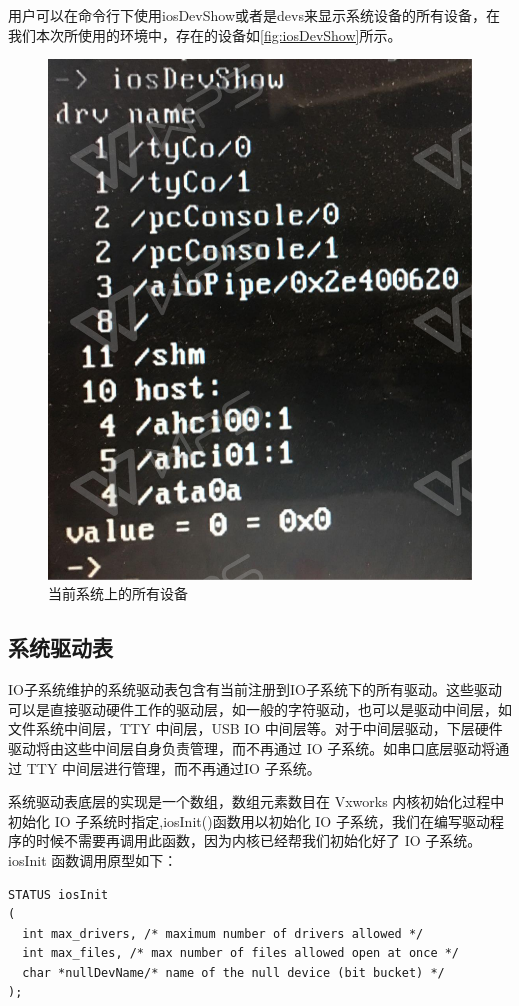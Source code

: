 用户可以在命令行下使用iosDevShow或者是devs来显示系统设备的所有设备，在我们本次所使用的环境中，存在的设备如\autoref{fig:iosDevShow}所示。
\begin{figure}[!h]
\centering
\includegraphics[width=.5\textwidth]{./graphics/iosDevShow.pdf}
\caption{当前系统上的所有设备}\label{fig:iosDevShow}
\end{figure}

\subsection{系统驱动表}

	\indent IO子系统维护的系统驱动表包含有当前注册到IO子系统下的所有驱动。这些驱动可以是直接驱动硬件工作的驱动层，如一般的字符驱动，也可以是驱动中间层，如文件系统中间层，TTY 中间层，USB IO 中间层等。对于中间层驱动，下层硬件驱动将由这些中间层自身负责管理，而不再通过 IO 子系统。如串口底层驱动将通过 TTY 中间层进行管理，而不再通过IO 子系统。
	
    \indent	系统驱动表底层的实现是一个数组，数组元素数目在 Vxworks 内核初始化过程中初始化 IO 子系统时指定,iosInit()函数用以初始化 IO 子系统，我们在编写驱动程序的时候不需要再调用此函数，因为内核已经帮我们初始化好了 IO 子系统。iosInit 函数调用原型如下：
\lstset{language=C}
\begin{lstlisting}
STATUS iosInit 
( 
  int max_drivers, /* maximum number of drivers allowed */ 
  int max_files, /* max number of files allowed open at once */ 
  char *nullDevName/* name of the null device (bit bucket) */ 
); 
\end{lstlisting}

